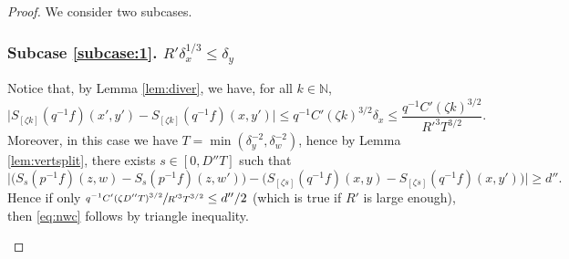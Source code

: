 \documentclass[JEP,XML,SOM,Unicode,NoEqCountersInSection]{cedram}
\newcounter{case}
\newcounter{subcase}
\theoremstyle{definition}
\theoremstyle{plain}
\newcommand\NN{\mathbb{N}}
\begin{document}
\begin{proof}
We consider two subcases.

\label{subcase:1}
\subsubsection*{Subcase \ref{subcase:1}. $R'\delta_x^{1/3}\leq \delta_y$}
Notice that, by Lemma \ref{lem:diver}, we have, for all $k\in \NN$,
\[
\bigl|S_{[\zeta k]}(q^{-1}f)(x',y')-
S_{[\zeta k]}(q^{-1}f)(x,y')\bigr|\leq q^{-1}C'(\zeta k)^{3/2}\delta_x\leq \frac{q^{-1}C'(\zeta k)^{3/2}}{R'^{3} T^{3/2}}.
\]
Moreover, in this case we have $T =\min ( \delta_y^{-2}, \delta_w^{-2})$, hence by Lemma \ref{lem:vertsplit}, there exists $s\in [0,D''T]$
such that
\[
\bigl|\bigl(S_s(p^{-1}f)(z,w)-S_s(p^{-1}f)(z,w')\bigr)-
\bigl(S_{[\zeta s]}(q^{-1}f)(x,y)-S_{[\zeta s]}(q^{-1}f)(x,y')\bigr)\bigr|\geq
d''.
\]
Hence if only
$\sfrac{q^{-1}C'(\zeta D''T)^{3/2}}{R'^{3}T^{3/2}}\leq d''/2$ (which is true if $R'$ is large enough), then \eqref{eq:nwc} follows by triangle inequality.

\label{subcase:2}

\end{proof}
\end{document}
